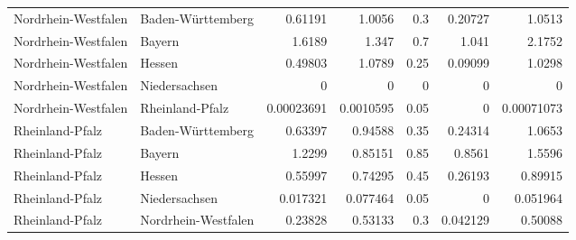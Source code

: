 \begin{table}[!htbp]
{\begin{tabular}{llrrrrr}
Nordrhein-Westfalen & Baden-Württemberg & 0.61191 & 1.0056 & 0.3 & 0.20727 & 1.0513 \\
Nordrhein-Westfalen & Bayern & 1.6189 & 1.347 & 0.7 & 1.041 & 2.1752 \\
Nordrhein-Westfalen & Hessen & 0.49803 & 1.0789 & 0.25 & 0.09099 & 1.0298 \\
Nordrhein-Westfalen & Niedersachsen & 0 & 0 & 0 & 0 & 0 \\
Nordrhein-Westfalen & Rheinland-Pfalz & 0.00023691 & 0.0010595 & 0.05 & 0 & 0.00071073 \\
Rheinland-Pfalz & Baden-Württemberg & 0.63397 & 0.94588 & 0.35 & 0.24314 & 1.0653 \\
Rheinland-Pfalz & Bayern & 1.2299 & 0.85151 & 0.85 & 0.8561 & 1.5596 \\
Rheinland-Pfalz & Hessen & 0.55997 & 0.74295 & 0.45 & 0.26193 & 0.89915 \\
Rheinland-Pfalz & Niedersachsen & 0.017321 & 0.077464 & 0.05 & 0 & 0.051964 \\
Rheinland-Pfalz & Nordrhein-Westfalen & 0.23828 & 0.53133 & 0.3 & 0.042129 & 0.50088 \\
\bottomrule
\end{tabular}
}
\end{table}
